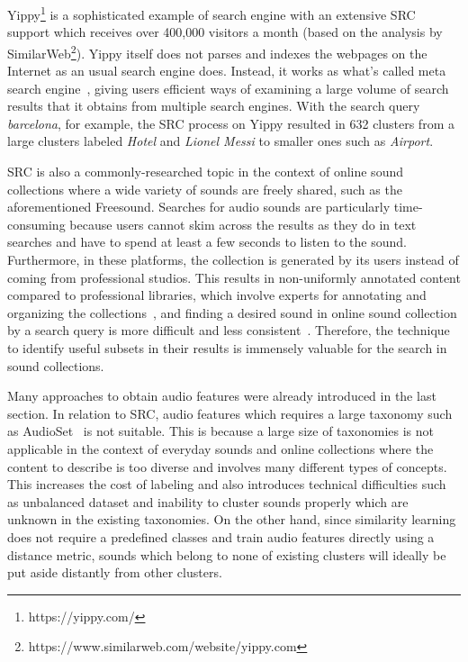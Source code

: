 Yippy\footnote{https://yippy.com/} is a sophisticated example of search engine with an extensive SRC support which receives over 400,000 visitors a month (based on the analysis by SimilarWeb\footnote{https://www.similarweb.com/website/yippy.com}). Yippy itself does not parses and indexes the webpages on the Internet as an usual search engine does. Instead, it works as what's called meta search engine~\cite{glover2000}, giving users efficient ways of examining a large volume of search results that it obtains from multiple search engines. With the search query \textit{barcelona}, for example, the SRC process on Yippy resulted in 632 clusters from a large clusters labeled \textit{Hotel} and \textit{Lionel Messi} to smaller ones such as \textit{Airport}.

SRC is also a commonly-researched topic in the context of online sound collections where a wide variety of sounds are freely shared, such as the aforementioned Freesound. Searches for audio sounds are particularly time-consuming because users cannot skim across the results as they do in text searches and have to spend at least a few seconds to listen to the sound. Furthermore, in these platforms, the collection is generated by its users instead of coming from professional studios. This results in non-uniformly annotated content compared to professional libraries, which involve experts for annotating and organizing the collections~\cite{frederic2013}, and finding a desired sound in online sound collection by a search query is more difficult and less consistent~\cite{xavier2020}.
Therefore, the technique to identify useful subsets in their results is immensely valuable for the search in sound collections. 

Many approaches to obtain audio features were already introduced in the last section. In relation to SRC, audio features which requires a large taxonomy such as AudioSet~\cite{jort2017} is not suitable. This is because a large size of taxonomies is not applicable in the context of everyday sounds and online collections where the content to describe is too diverse and involves many different types of concepts. This increases the cost of labeling and also introduces technical difficulties such as unbalanced dataset and inability to cluster sounds properly which are unknown in the existing taxonomies. On the other hand, since similarity learning does not require a predefined classes and train audio features directly using a distance metric, sounds which belong to none of existing clusters will ideally be put aside distantly from other clusters.

